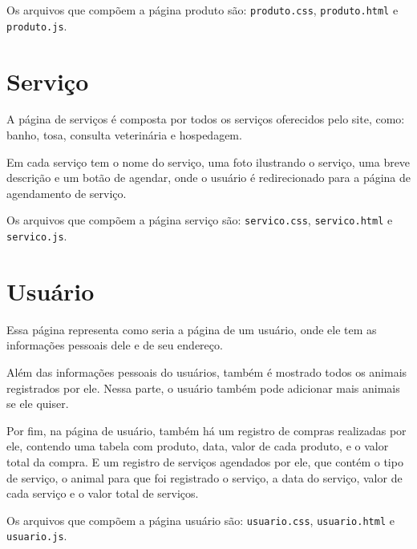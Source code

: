 Os arquivos que compõem a página produto são: \texttt{produto.css}, \texttt{produto.html} e
\texttt{produto.js}.

\section{Serviço}
A página de serviços é composta por todos os serviços oferecidos pelo site, como: banho, tosa,
consulta veterinária e hospedagem.

Em cada serviço tem o nome do serviço, uma foto ilustrando o serviço, uma breve descrição e um
botão de agendar, onde o usuário é redirecionado para a página de agendamento de serviço.

Os arquivos que compõem a página serviço são: \texttt{servico.css}, \texttt{servico.html} e
\texttt{servico.js}.

\section{Usuário}
Essa página representa como seria a página de um usuário, onde ele tem as informações pessoais
dele e de seu endereço.

Além das informações pessoais do usuários, também é mostrado todos os animais registrados por
ele. Nessa parte, o usuário também pode adicionar mais animais se ele quiser.

Por fim, na página de usuário, também há um registro de compras realizadas por ele, contendo
uma tabela com produto, data, valor de cada produto, e o valor total da compra. E um registro
de serviços agendados por ele, que contém o tipo de serviço, o animal para que foi registrado
o serviço, a data do serviço, valor de cada serviço e o valor total de serviços.

Os arquivos que compõem a página usuário são: \texttt{usuario.css}, \texttt{usuario.html} e
\texttt{usuario.js}.
